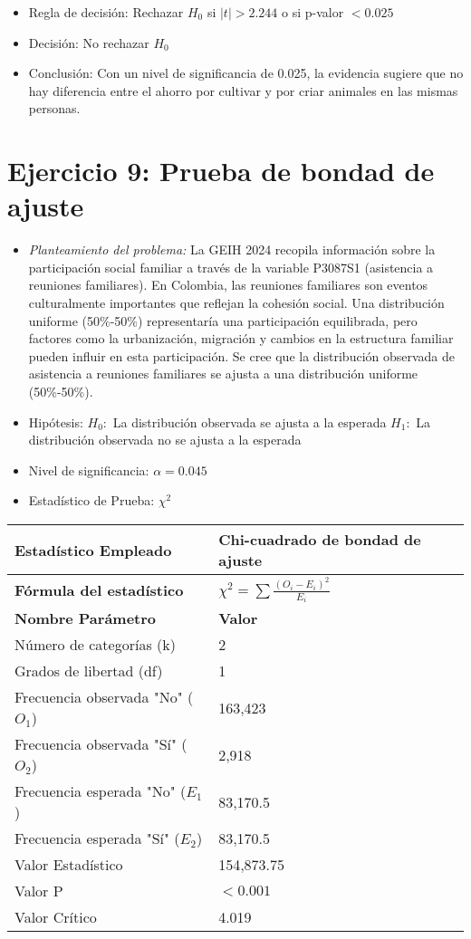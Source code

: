 \documentclass[12pt,a4paper]{article}
\begin{document}
\begin{itemize}
    \item Regla de decisión: Rechazar $H_0$ si $|t| > 2.244$ o si p-valor $< 0.025$
    \item Decisión: No rechazar $H_0$
    \item Conclusión: Con un nivel de significancia de 0.025, la evidencia sugiere que no hay diferencia entre el ahorro por cultivar y por criar animales en las mismas personas.
\end{itemize}

\section*{Ejercicio 9: Prueba de bondad de ajuste}
\begin{itemize}
    \item \textit{Planteamiento del problema:} La GEIH 2024 recopila información sobre la participación social familiar a través de la variable P3087S1 (asistencia a reuniones familiares). En Colombia, las reuniones familiares son eventos culturalmente importantes que reflejan la cohesión social. Una distribución uniforme (50\%-50\%) representaría una participación equilibrada, pero factores como la urbanización, migración y cambios en la estructura familiar pueden influir en esta participación. Se cree que la distribución observada de asistencia a reuniones familiares se ajusta a una distribución uniforme (50\%-50\%).
    \item Hipótesis: \quad $H_{0}:$ La distribución observada se ajusta a la esperada \hspace{1cm} $H_{1}:$ La distribución observada no se ajusta a la esperada
    \item Nivel de significancia: $\alpha = 0.045$
    \item Estadístico de Prueba: $\chi^2$
\end{itemize}

\begin{tabular}{|m{7cm}|m{7cm}|}
\hline
\textbf{Estadístico Empleado} & Chi-cuadrado de bondad de ajuste \\ \hline
\textbf{Fórmula del estadístico} & $\chi^2 = \sum \frac{(O_i - E_i)^2}{E_i}$ \\ \hline
\textbf{Nombre Parámetro} & \textbf{Valor} \\ \hline
Número de categorías (k) & 2 \\ \hline
Grados de libertad (df) & 1 \\ \hline
Frecuencia observada "No" ($O_1$) & 163,423 \\ \hline
Frecuencia observada "Sí" ($O_2$) & 2,918 \\ \hline
Frecuencia esperada "No" ($E_1$) & 83,170.5 \\ \hline
Frecuencia esperada "Sí" ($E_2$) & 83,170.5 \\ \hline
Valor Estadístico & 154,873.75 \\ \hline
Valor P & $< 0.001$ \\ \hline
Valor Crítico & 4.019 \\ \hline
\end{tabular}
\end{document}
